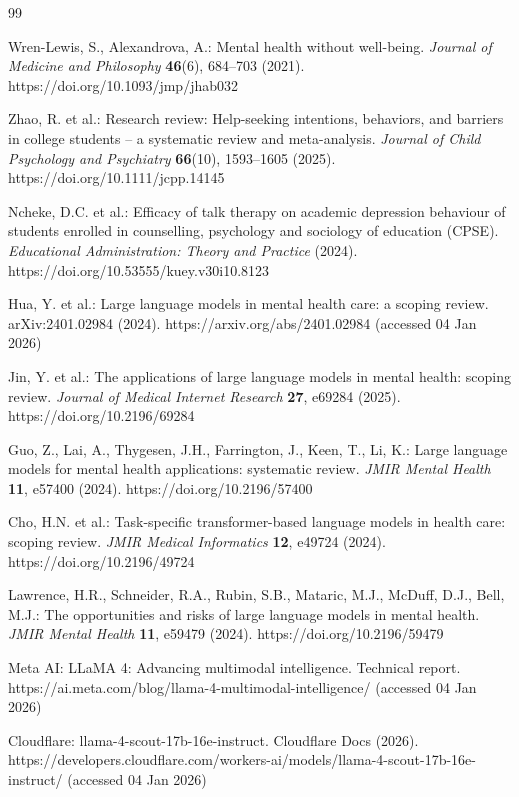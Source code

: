\documentclass[sigconf]{acmart}
\begin{document}
\begin{thebibliography}{99}

 Wren-Lewis, S., Alexandrova, A.: Mental health without well-being. \textit{Journal of Medicine and Philosophy} \textbf{46}(6), 684--703 (2021). https://doi.org/10.1093/jmp/jhab032

 Zhao, R. et al.: Research review: Help-seeking intentions, behaviors, and barriers in college students -- a systematic review and meta-analysis. \textit{Journal of Child Psychology and Psychiatry} \textbf{66}(10), 1593--1605 (2025). https://doi.org/10.1111/jcpp.14145

 Ncheke, D.C. et al.: Efficacy of talk therapy on academic depression behaviour of students enrolled in counselling, psychology and sociology of education (CPSE). \textit{Educational Administration: Theory and Practice} (2024). https://doi.org/10.53555/kuey.v30i10.8123

 Hua, Y. et al.: Large language models in mental health care: a scoping review. arXiv:2401.02984 (2024). https://arxiv.org/abs/2401.02984 (accessed 04 Jan 2026)

 Jin, Y. et al.: The applications of large language models in mental health: scoping review. \textit{Journal of Medical Internet Research} \textbf{27}, e69284 (2025). https://doi.org/10.2196/69284

 Guo, Z., Lai, A., Thygesen, J.H., Farrington, J., Keen, T., Li, K.: Large language models for mental health applications: systematic review. \textit{JMIR Mental Health} \textbf{11}, e57400 (2024). https://doi.org/10.2196/57400

 Cho, H.N. et al.: Task-specific transformer-based language models in health care: scoping review. \textit{JMIR Medical Informatics} \textbf{12}, e49724 (2024). https://doi.org/10.2196/49724

 Lawrence, H.R., Schneider, R.A., Rubin, S.B., Mataric, M.J., McDuff, D.J., Bell, M.J.: The opportunities and risks of large language models in mental health. \textit{JMIR Mental Health} \textbf{11}, e59479 (2024). https://doi.org/10.2196/59479

 Meta AI: LLaMA 4: Advancing multimodal intelligence. Technical report. https://ai.meta.com/blog/llama-4-multimodal-intelligence/ (accessed 04 Jan 2026)

 Cloudflare: llama-4-scout-17b-16e-instruct. Cloudflare Docs (2026). https://developers.cloudflare.com/workers-ai/models/llama-4-scout-17b-16e-instruct/ (accessed 04 Jan 2026)


\end{thebibliography}
\end{document}

